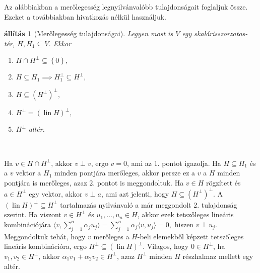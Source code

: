 \documentclass[9pt, a4paper, showtrims]{memoir}
\makeatletter
\renewenvironment{proof}[1][\proofname]
    {\par\pushQED{\qed}%
    \normalfont \topsep6\p@\@plus6\p@\relax
    \trivlist
    \item[\hskip\labelsep
        \itshape
    #1\@addpunct{:}]\ignorespaces}
    {\popQED\endtrivlist\@endpefalse}
\theoremstyle{plain}
\newtheorem{proposition}{állítás}[chapter]
\theoremstyle{remark}
\theoremstyle{definition}
\DeclareMathOperator{\lin}{lin}
\newcommand{\ip}[2]{\langle#1,#2\rangle}
\makeatother
\begin{document}
Az alábbiakban a merőlegesség legnyilvánvalóbb tulajdonságait foglaljuk össze.
Ezeket a továbbiakban hivatkozás nélkül használjuk.
\begin{proposition}[Merőlegesség tulajdonságai]
	Legyen most is $V$ egy skalárisszorzatos-tér, $H,H_1\subseteq V$.
	Ekkor
	\begin{enumerate}
		\item $H\cap H^{\perp}\subseteq\left\{ 0 \right\},$
		\item $H\subseteq H_1\implies H_1^\perp\subseteq H^\perp,$
		\item $H\subseteq \left( H^\perp \right)^\perp,$
		\item $H^{\perp}=\left( \lin H \right)^\perp,$
		\item $H^\perp$ altér.\qedhere
	\end{enumerate}
\end{proposition}\
\begin{proof}
	Ha $v\in H\cap H^\perp$, akkor $v\perp v$, ergo $v=0$, ami az 1. pontot igazolja.
	Ha $H\subseteq H_1$ és a $v$ vektor a $H_1$ minden pontjára merőleges, akkor persze ez a $v$ a $H$ minden pontjára is merőleges,
	azaz 2. pontot is meggondoltuk.
	Ha $v\in H$ rögzített és $a\in H^\perp$ egy vektor, akkor $v\perp a$, ami azt jelenti, hogy $H\subseteq \left( H^\perp \right)^\perp$.
	A $(\lin H)^\perp\subseteq H^\perp$ tartalmazás nyilvánvaló a már meggondolt 2. tulajdonság szerint.
	Ha viszont $v\in H^\perp$ és $u_1,\ldots,u_n\in H$, akkor ezek tetszőleges lineáris kombinációjára
	\begin{math}
		\ip{v}{\sum_{j=1}^n\alpha_ju_j}
		=
		\sum_{j=1}^n\alpha_j\ip{v}{u_j}
		=
		0,
	\end{math}
	hiszen $v\perp u_j$.
	Meggondoltuk tehát, hogy $v$ merőleges a $H$-beli elemekből képzett tetszőleges lineáris kombinációra,
	ergo $H^\perp\subseteq\left( \lin H \right)^\perp.$
	Vilagos, hogy $0\in H^\perp$, ha $v_1,v_2\in H^\perp$, akkor $\alpha_1v_1+\alpha_2v_2\in H^\perp$, azaz
	$H^\perp$ minden $H$ részhalmaz mellett egy altér.
\end{proof}
\end{document}
